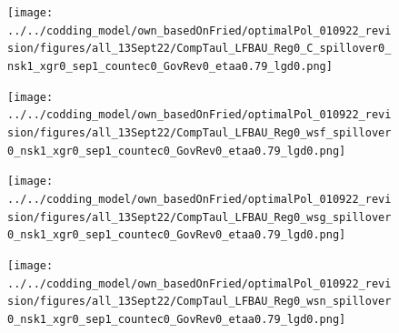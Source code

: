 \begin{figure}[h!!]
\begin{minipage}[]{0.32\textwidth}
	\end{minipage}		
	\begin{minipage}[]{0.32\textwidth}
		\texttt{[image: ../../codding\_model/own\_basedOnFried/optimalPol\_010922\_revision/figures/all\_13Sept22/CompTaul\_LFBAU\_Reg0\_C\_spillover0\_nsk1\_xgr0\_sep1\_countec0\_GovRev0\_etaa0.79\_lgd0.png]}
	\end{minipage}	
\begin{minipage}[]{0.32\textwidth}
\texttt{[image: ../../codding\_model/own\_basedOnFried/optimalPol\_010922\_revision/figures/all\_13Sept22/CompTaul\_LFBAU\_Reg0\_wsf\_spillover0\_nsk1\_xgr0\_sep1\_countec0\_GovRev0\_etaa0.79\_lgd0.png]}
\end{minipage}		
\begin{minipage}[]{0.32\textwidth}
\texttt{[image: ../../codding\_model/own\_basedOnFried/optimalPol\_010922\_revision/figures/all\_13Sept22/CompTaul\_LFBAU\_Reg0\_wsg\_spillover0\_nsk1\_xgr0\_sep1\_countec0\_GovRev0\_etaa0.79\_lgd0.png]}
\end{minipage}		
\begin{minipage}[]{0.32\textwidth}
\texttt{[image: ../../codding\_model/own\_basedOnFried/optimalPol\_010922\_revision/figures/all\_13Sept22/CompTaul\_LFBAU\_Reg0\_wsn\_spillover0\_nsk1\_xgr0\_sep1\_countec0\_GovRev0\_etaa0.79\_lgd0.png]}
\end{minipage}	
\end{figure}


